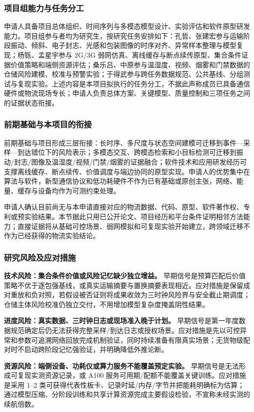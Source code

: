 \subsubsection{项目组能力与任务分工}

申请人具备项目总体组织、时间序列与多模态模型设计、实验评估和软件原型研发能力。项目组参与者均为研究生，按研究任务安排如下：孔哲、张建宏参与运输阶段振动、倾斜、电子封志、光感和包装图像的时序对齐、异常样本整理与模型复现；杨铄、孟星宇参与 2G/3G 弱网仿真、离线缓存与断点续传原型、集合条件证据价值策略和端侧资源评估；桑乐吕、中原参与温湿度、视频、烟雾和门禁数据的仓储风险建模、校准与预警实验；于得武参与跨任务数据规范、公共基线、分组测试与复现实验。上述内容是本项目拟执行的任务分工，不据此声称成员已具备通信硬件或物流现场专长；申请人负责总体方案、关键模型、质量控制和三项任务之间的证据状态衔接。

\subsubsection{前期基础与本项目的衔接}

前期基础与项目形成三层衔接：长时序、多尺度与状态空间建模可迁移到事件—采样—到达错位下的风险表示；多模态交互、跨模态检索和小目标检测可迁移到振动/封志/图像及温湿度/视频/门禁/烟雾的证据融合；软件技术和应用研发经历可支撑离线缓存、断点续传、价值调度与端边协同的原型实现。申请人的优势集中在算法与软件，新型通信协议和低功耗硬件不作为已有基础或原创主张，网络、能量、缓存与设备均作为可测约束处理。

申请人确认目前尚无与本申请直接对应的物流数据、代码、原型、软件著作权、专利或预实验结果。本节据此只用已公开论文、项目经历和平台条件证明相邻方法能力；直接证据将从基础可控场景、弱网模拟和可复现实验开始建立，跨领域迁移不作为已经获得的物流实验结论。

\subsubsection{研究风险及应对措施}

\textbf{技术风险：集合条件价值或风险记忆缺少独立增益。} 早期信号是预算匹配后价值策略不优于逐包强基线，或真实运输摘要与置换摘要表现相近。应对措施是保留成对重放和负对照，若假设被否证则将成果收敛为三时钟风险界与安全截止期调度；仓储主体风险校准仍独立交付，不用增加模型复杂度掩盖阴性结果。

\textbf{进度风险：真实数据、三时钟日志或现场准入晚于计划。} 早期信号是第一年度数据规范确定后仍无法获得完整采样/到达日志或授权场景。应对措施是先以可控异常和参数可追溯网络回放完成机制验证，同时持续准备有限真实场景；无货物级配对时不启动跨阶段记忆强验证，并明确降低外推论断。

\textbf{资源风险：端侧设备、功耗仪或算力服务不能覆盖预定实验。} 早期信号是无法形成可复现实测资源记录，或 A100 服务可用期/配额不能覆盖关键训练。应对措施是采用 1--2 类可获得代表性板卡、记录时延/内存/字节并把能耗明确标为估算；通过模型压缩、分阶段训练和共享计算资源完成主要假设检验，不宣称未经实测的续航倍数。
